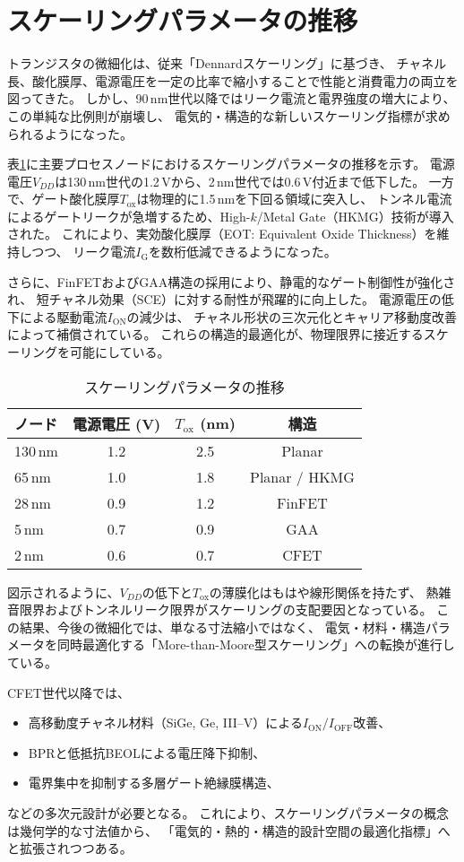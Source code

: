 \section{スケーリングパラメータの推移}
トランジスタの微細化は、従来「Dennardスケーリング」に基づき、  
チャネル長、酸化膜厚、電源電圧を一定の比率で縮小することで性能と消費電力の両立を図ってきた。  
しかし、90\,nm世代以降ではリーク電流と電界強度の増大により、この単純な比例則が崩壊し、  
電気的・構造的な新しいスケーリング指標が求められるようになった。

表\ref{tab:scaling}に主要プロセスノードにおけるスケーリングパラメータの推移を示す。  
電源電圧$V_{DD}$は130\,nm世代の1.2\,Vから、2\,nm世代では0.6\,V付近まで低下した。  
一方で、ゲート酸化膜厚$T_\text{ox}$は物理的に1.5\,nmを下回る領域に突入し、  
トンネル電流によるゲートリークが急増するため、High-$k$/Metal Gate（HKMG）技術が導入された。  
これにより、実効酸化膜厚（EOT: Equivalent Oxide Thickness）を維持しつつ、  
リーク電流$I_\text{G}$を数桁低減できるようになった。

さらに、FinFETおよびGAA構造の採用により、静電的なゲート制御性が強化され、  
短チャネル効果（SCE）に対する耐性が飛躍的に向上した。  
電源電圧の低下による駆動電流$I_\text{ON}$の減少は、  
チャネル形状の三次元化とキャリア移動度改善によって補償されている。  
これらの構造的最適化が、物理限界に接近するスケーリングを可能にしている。

\begin{table}[htbp]
\centering
\caption{スケーリングパラメータの推移}
\label{tab:scaling}
\begin{tabular}{lccc}
\toprule
ノード & 電源電圧 (V) & $T_\text{ox}$ (nm) & 構造 \\
\midrule
130\,nm & 1.2 & 2.5 & Planar \\
65\,nm  & 1.0 & 1.8 & Planar / HKMG \\
28\,nm  & 0.9 & 1.2 & FinFET \\
5\,nm   & 0.7 & 0.9 & GAA \\
2\,nm   & 0.6 & 0.7 & CFET \\
\bottomrule
\end{tabular}
\end{table}

図示されるように、$V_{DD}$の低下と$T_\text{ox}$の薄膜化はもはや線形関係を持たず、  
熱雑音限界およびトンネルリーク限界がスケーリングの支配要因となっている。  
この結果、今後の微細化では、単なる寸法縮小ではなく、  
電気・材料・構造パラメータを同時最適化する「More-than-Moore型スケーリング」への転換が進行している。

CFET世代以降では、  
\begin{itemize}
    \item 高移動度チャネル材料（SiGe, Ge, III–V）による$I_\text{ON}/I_\text{OFF}$改善、  
    \item BPRと低抵抗BEOLによる電圧降下抑制、  
    \item 電界集中を抑制する多層ゲート絶縁膜構造、  
\end{itemize}
などの多次元設計が必要となる。  
これにより、スケーリングパラメータの概念は幾何学的な寸法値から、  
「電気的・熱的・構造的設計空間の最適化指標」へと拡張されつつある。
